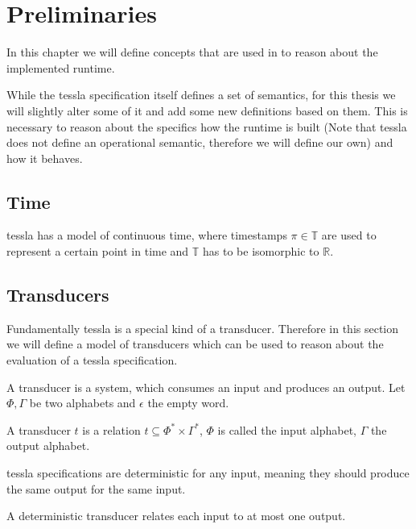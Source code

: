 \chapter{Preliminaries}
\label{sec:definitions}

In this chapter we will define concepts that are used in  to reason about the implemented runtime.

While the \gls{tessla} specification itself defines a set of semantics, for this thesis we will slightly alter some of it and add some new definitions based on them.
This is necessary to reason about the specifics how the runtime is built (Note that \gls{tessla} does not define an operational semantic, therefore we will define our own) and how it behaves.

\section{Time}
\label{sec:definitions:time}

\gls{tessla} has a model of continuous time, where timestamps \(\pi \in \mathbb{T} \) are used to represent a certain point in time and \(\mathbb{T}\) has to be isomorphic to \(\mathbb{R}\).

\section{Transducers}
\label{sec:definitions:transducers}

Fundamentally \gls{tessla} is a special kind of a transducer.
Therefore in this section we will define a model of transducers which can be used to reason about the evaluation of a \gls{tessla} specification.

A transducer is a system, which consumes an input and produces an output.
Let \(\Phi, \Gamma\) be two alphabets and \(\epsilon\) the empty word.

\begin{definition}[name = Transducer]\label{def:transducer}
  A transducer \(t\) is a relation \(t \subseteq \Phi^* \times \Gamma^*\), \(\Phi\) is called the input alphabet, \(\Gamma\) the output alphabet.
\end{definition}

\gls{tessla} specifications are deterministic for any input, meaning they should produce the same output for the same input.

\begin{definition}[name = Deterministic Transducer]\label{def:deterministic_transducer}
  A deterministic transducer relates each input to at most one output.
\end{definition}

